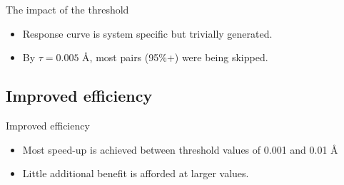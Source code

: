 \documentclass[10pt]{beamer}
\begin{document}
\begin{frame}[t]{The impact of the threshold}

\begin{center}
\scalebox{.8}{}
\end{center}

\begin{itemize}
    \item Response curve is system specific but trivially generated.
    \item By $\tau = 0.005$ \AA, most pairs (95\%+) were being skipped.
\end{itemize}

\end{frame}


\subsection{Improved efficiency}


\begin{frame}[t]{Improved efficiency}

\begin{center}
\scalebox{.8}{}
\end{center}

\begin{itemize}
    \item Most speed-up is achieved between threshold values of 0.001 and 0.01 \AA
    \item Little additional benefit is afforded at larger values.
\end{itemize}
\end{frame}

\end{document}

